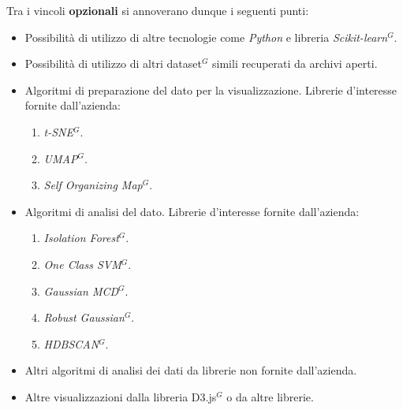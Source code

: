 \noindent Tra i vincoli \textbf{opzionali} si annoverano dunque i seguenti punti:
\begin{itemize}
\item Possibilità di utilizzo di altre tecnologie come \textit{Python} e libreria \textit{Scikit-learn$^{G}$}. 
\item Possibilità di utilizzo di altri dataset$^{G}$ simili recuperati da archivi aperti.
\item Algoritmi di preparazione del dato per la visualizzazione. Librerie d'interesse fornite dall'azienda:
	\begin{enumerate}
                    \item \textit{t-SNE$^{G}$}.
                    \item \textit{UMAP$^{G}$}.
                    \item \textit{Self Organizing Map$^{G}$}.
	\end{enumerate}
\item Algoritmi di analisi del dato. Librerie d'interesse fornite dall'azienda:
	\begin{enumerate}
                    \item \textit{Isolation Forest$^{G}$}.
                    \item \textit{One Class SVM$^{G}$}.
                    \item \textit{Gaussian MCD$^{G}$}.
                    \item \textit{Robust Gaussian$^{G}$}.
                    \item \textit{HDBSCAN$^{G}$}.
	\end{enumerate}
\item Altri algoritmi di analisi dei dati da librerie non fornite dall’azienda.
\item Altre visualizzazioni dalla libreria D3.js$^{G}$ o da altre librerie.
\end{itemize}



